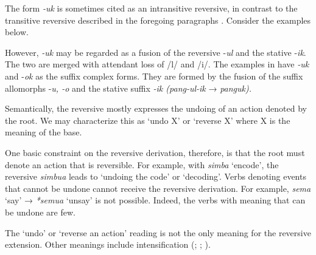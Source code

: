 \documentclass[output=paper]{langsci/langscibook}
\begin{document}
The form \textit{{}-uk} is sometimes cited as an intransitive reversive, in contrast to the transitive reversive described in the foregoing paragraphs \citep[239]{Ashton1947}. Consider the examples below.

\ea\label{ex:ngonyaningowa:6}
\ea\label{ex:ngonyaningowa:6a}
\ex\label{ex:ngonyaningowa:6b}
\ex\label{ex:ngonyaningowa:6c}
\ex\label{ex:ngonyaningowa:6d}
\ex\label{ex:ngonyaningowa:6e}
\z
\z

However, \textit{{}-uk} may be regarded as a fusion of the reversive -\textit{ul} and the stative -\textit{ik}. The two are merged with attendant loss of /l/ and /i/. The examples in  have \textit{{}-uk} and -\textit{ok} as the suffix complex forms. They are formed by the fusion of the suffix allomorphs -\textit{u, -o} and the stative suffix \textit{{}-ik (pang-ul-ik }→ \textit{panguk).} 

  Semantically, the reversive mostly expresses the undoing of an action denoted by the root. We may characterize this as ‘undo X’ or ‘reverse X’ where X is the meaning of the base.

\ea\label{ex:ngonyaningowa:7}
\ea\label{ex:ngonyaningowa:7a}
\ex\label{ex:ngonyaningowa:7b}
\ex\label{ex:ngonyaningowa:7c}
\ex\label{ex:ngonyaningowa:7d}
\ex\label{ex:ngonyaningowa:7e}
\z
\z

One basic constraint on the reversive derivation, therefore, is that the root must denote an action that is reversible. For example, with \textit{simba} ‘encode’, the reversive \textit{simbua} leads to ‘undoing the code’ or ‘decoding’. Verbs denoting events that cannot be undone cannot receive the reversive derivation. For example, \textit{sema} ‘say’ → \textit{*semua} ‘unsay’ is not possible. Indeed, the verbs with meaning that can be undone are few. 

The ‘undo’ or ‘reverse an action’ reading is not the only meaning for the reversive extension. Other meanings include intensification (\citealt[239]{Ashton1947}; \citealt[90]{Polome1967}; \citealt[78]{Schadeberg2003}).   
\end{document}
